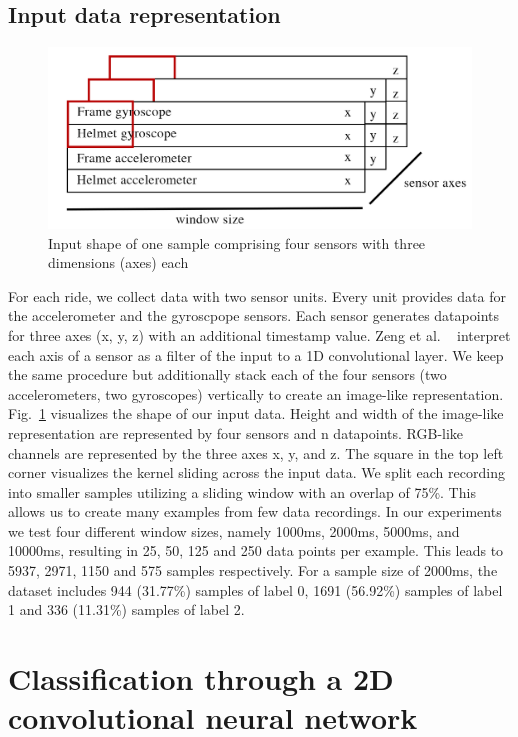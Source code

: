 \documentclass[runningheads]{llncs}
\begin{document}
\subsection{Input data representation}

\begin{figure}
\includegraphics[width=\textwidth]{input_shape.png}
\caption{Input shape of one sample comprising four sensors with three dimensions (axes) each}
\label{fig2}	
\end{figure}

For each ride, we collect data with two sensor units.
Every unit provides data for the accelerometer and the gyroscpope sensors.
Each sensor generates datapoints for three axes (x, y, z) with an additional timestamp value.
Zeng et al. ~\cite{zeng2014convolutional} interpret each axis of a sensor as a filter of the input to a 1D convolutional layer.
We keep the same procedure but additionally stack each of the four sensors (two accelerometers, two gyroscopes) vertically to create an image-like representation.
Fig.~\ref{fig2} visualizes the shape of our input data.
Height and width of the image-like representation are represented by four sensors and n datapoints.
RGB-like channels are represented by the three axes x, y, and z.
The square in the top left corner visualizes the kernel sliding across the input data.
We split each recording into smaller samples utilizing a sliding window with an overlap of 75\%.
This allows us to create many examples from few data recordings.
In our experiments we test four different window sizes, namely 1000ms, 2000ms, 5000ms, and 10000ms, resulting in 25, 50, 125 and 250 data points per example.
This leads to 5937, 2971, 1150 and 575 samples respectively.
For a sample size of 2000ms, the dataset includes 944 (31.77\%) samples of label 0, 1691 (56.92\%) samples of label 1 and 336 (11.31\%) samples of label 2.



\section{Classification through a 2D convolutional neural network}
\end{document}
